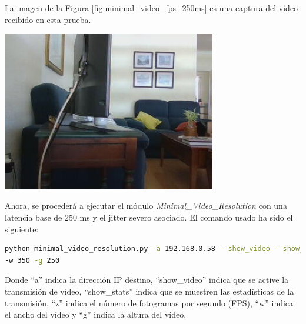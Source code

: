 \newpage
La imagen de la Figura \ref{fig:minimal_video_fps_250ms} es una captura del vídeo recibido en esta prueba.
\begin{center}
  \includegraphics[width = 0.7\textwidth]{images/VideoRecibido6.2.png}
  \label{fig:minimal_video_fps_250ms}
\end{center}

\newpage


Ahora, se procederá a ejecutar el módulo \textit{Minimal\_Video\_Resolution} con una latencia base de 250 ms y el jitter severo asociado. El comando usado ha sido el siguiente:

\begin{lstlisting}[language=bash,basicstyle=\ttfamily\scriptsize]
python minimal_video_resolution.py -a 192.168.0.58 --show_video --show_stats -z 12 \\
-w 350 -g 250
\end{lstlisting}
Donde ``a'' indica la dirección IP destino, ``show\_video'' indica que se active la transmisión de vídeo, ``show\_stats'' indica que se muestren las estadísticas de la transmisión, ``z'' indica el número de fotogramas por segundo (FPS), ``w'' indica el ancho del vídeo y ``g'' indica la altura del vídeo.
\vspace{\baselineskip}

